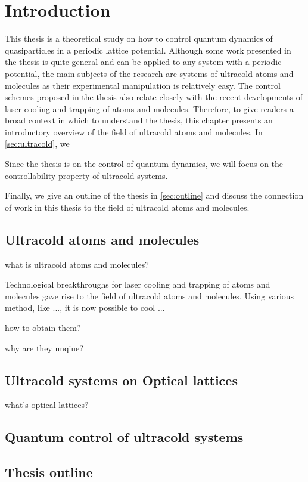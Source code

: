 
\chapter{Introduction}
\label{ch:Introduction}

This thesis is a theoretical study on how to control quantum dynamics of quasiparticles in a periodic lattice potential. 
Although some work presented in the thesis is quite general and can be applied to any system with a periodic potential, 
the main subjects of the research are systems of ultracold atoms and molecules as their experimental manipulation is 
relatively easy. The control schemes proposed in the thesis also relate closely with the recent developments of laser 
cooling and trapping of atoms and molecules. Therefore, to give readers a broad context in which to understand the 
thesis, this chapter presents an introductory overview of the field of ultracold atoms and molecules. In \autoref{sec:ultracold}, we 

 Since the thesis is on the control of quantum 
dynamics, we will focus on the controllability property of ultracold systems. 

Finally, we give an outline of the thesis in \autoref{sec:outline} and discuss the connection of work in this thesis to the
field of ultracold atoms and molecules. 

\section{Ultracold atoms and molecules}
\label{sec:ultracold}

what is ultracold atoms and molecules?

Technological breakthroughs for laser cooling and trapping of atoms and molecules gave rise to the
field of ultracold atoms and molecules. Using various method, like ..., it is now possible to cool ...

how to obtain them?

why are they unqiue?

\section{Ultracold systems on Optical lattices}
\label{sec:opticalLattices}

what's optical lattices?



\section{Quantum control of ultracold systems}
\label{sec:control}

\section{Thesis outline}
\label{sec:outline}

